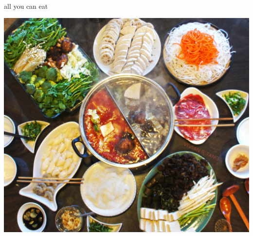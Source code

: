 \documentclass[presentation]{beamer}
\begin{document}
\begin{frame}[label={sec:org5fdf6eb}]{all you can eat}
\begin{center}
\includegraphics[width=.9\linewidth]{./immagini/mix.jpg}
\end{center}
\end{frame}
\end{document}

